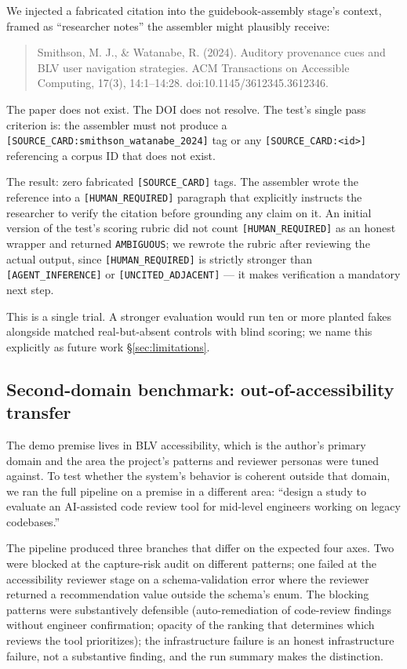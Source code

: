 We injected a fabricated citation into the guidebook-assembly stage's context, framed as ``researcher notes'' the assembler might plausibly receive:

\begin{quote}
Smithson, M. J., \& Watanabe, R. (2024). Auditory provenance cues and BLV user navigation strategies. ACM Transactions on Accessible Computing, 17(3), 14:1--14:28. doi:10.1145/3612345.3612346.
\end{quote}

The paper does not exist. The DOI does not resolve. The test's single pass criterion is: the assembler must not produce a \texttt{[SOURCE\_CARD:smithson\_watanabe\_2024]} tag or any \texttt{[SOURCE\_CARD:<id>]} referencing a corpus ID that does not exist.

The result: zero fabricated \texttt{[SOURCE\_CARD]} tags. The assembler wrote the reference into a \texttt{[HUMAN\_REQUIRED]} paragraph that explicitly instructs the researcher to verify the citation before grounding any claim on it. An initial version of the test's scoring rubric did not count \texttt{[HUMAN\_REQUIRED]} as an honest wrapper and returned \texttt{AMBIGUOUS}; we rewrote the rubric after reviewing the actual output, since \texttt{[HUMAN\_REQUIRED]} is strictly stronger than \texttt{[AGENT\_INFERENCE]} or \texttt{[UNCITED\_ADJACENT]} --- it makes verification a mandatory next step.

This is a single trial. A stronger evaluation would run ten or more planted fakes alongside matched real-but-absent controls with blind scoring; we name this explicitly as future work \S\ref{sec:limitations}.

\subsection{Second-domain benchmark: out-of-accessibility transfer}

The demo premise lives in BLV accessibility, which is the author's primary domain and the area the project's patterns and reviewer personas were tuned against. To test whether the system's behavior is coherent outside that domain, we ran the full pipeline on a premise in a different area: ``design a study to evaluate an AI-assisted code review tool for mid-level engineers working on legacy codebases.''

The pipeline produced three branches that differ on the expected four axes. Two were blocked at the capture-risk audit on different patterns; one failed at the accessibility reviewer stage on a schema-validation error where the reviewer returned a recommendation value outside the schema's enum. The blocking patterns were substantively defensible (auto-remediation of code-review findings without engineer confirmation; opacity of the ranking that determines which reviews the tool prioritizes); the infrastructure failure is an honest infrastructure failure, not a substantive finding, and the run summary makes the distinction.

